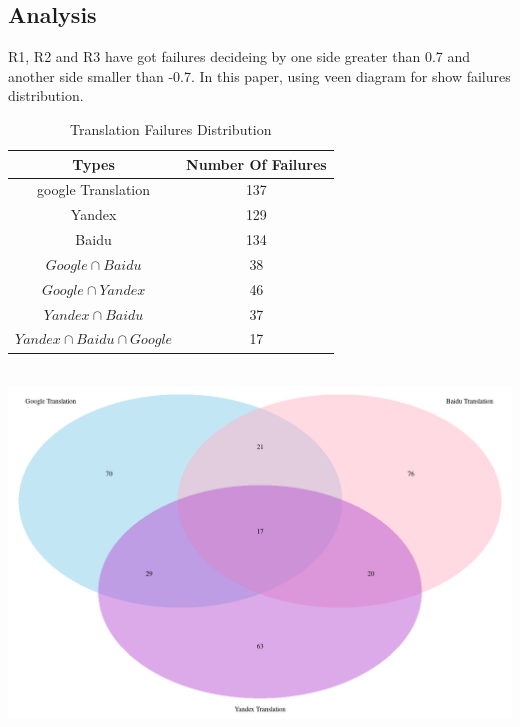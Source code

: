 \documentclass[conference]{IEEEtran}
\begin{document}
\subsection{Analysis}
R1, R2 and R3 have got failures decideing by one side greater than 0.7 and
another side smaller than -0.7. In this paper, using veen diagram for show
failures distribution.
  \begin{table}[h]
    \caption {Translation Failures Distribution}
    \begin{center}
      \begin{tabular}{|c|c|}
        \hline
        Types & Number Of Failures \\
        \hline\hline
        google Translation & 137\\
        \hline
        Yandex & 129 \\
        \hline
        Baidu & 134 \\
        \hline
        $Google \cap Baidu$ & 38 \\
        \hline
        $Google \cap Yandex$ & 46 \\
        \hline
        $Yandex \cap Baidu$ & 37 \\
        \hline
        $Yandex \cap Baidu \cap Google$ & 17 \\
        \hline
      \end{tabular}
    \end{center}
  \end{table}\\

\includegraphics[width=0.35\paperwidth]{./img/veen.png}




\end{document}
